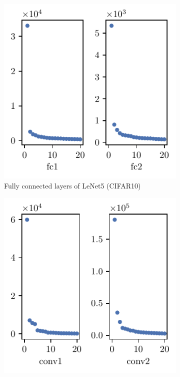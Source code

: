 \begin{figure}[th]
\begin{subfigure}[b]{0.33\textwidth}
        \includegraphics[width=\textwidth]{Figures/Eigenspectrum/xxT/xxT_sigval_d20_CIFAR10_Exp1_LeNet5_fixlr0.01R1_E-1_fc1fc2.pdf}
        \caption{Fully connected layers of LeNet5 (CIFAR10)}
        \label{fig:xxT_sig_lenet}
    \end{subfigure}%
    \hfill
    \begin{subfigure}[b]{0.33\textwidth}
        \centering
        \captionsetup{justification=centering}
        \includegraphics[width=\textwidth]{Figures/Eigenspectrum/xxT/xxTConv_sigval_d20_CIFAR10_Exp1_LeNet5_fixlr0.01_E-1.pdf}

\end{subfigure}
\end{figure}
